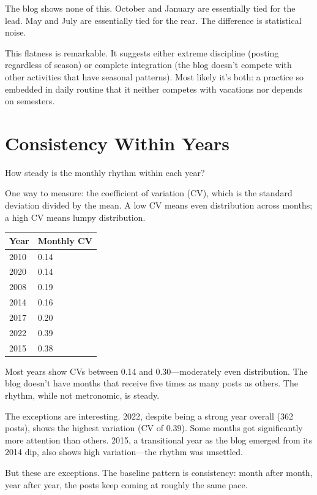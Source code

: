 The blog shows none of this. October and January are essentially tied for the lead. May and July are essentially tied for the rear. The difference is statistical noise.

This flatness is remarkable. It suggests either extreme discipline (posting regardless of season) or complete integration (the blog doesn't compete with other activities that have seasonal patterns). Most likely it's both: a practice so embedded in daily routine that it neither competes with vacations nor depends on semesters.

\bigskip

\section*{Consistency Within Years}

How steady is the monthly rhythm within each year?

One way to measure: the coefficient of variation (CV), which is the standard deviation divided by the mean. A low CV means even distribution across months; a high CV means lumpy distribution.

\begin{center}
\begin{tabular}{ll}
\toprule
\textbf{Year} & \textbf{Monthly CV} \\
\midrule
2010 & 0.14 \\
2020 & 0.14 \\
2008 & 0.19 \\
2014 & 0.16 \\
2017 & 0.20 \\
2022 & 0.39 \\
2015 & 0.38 \\
\bottomrule
\end{tabular}
\end{center}

Most years show CVs between 0.14 and 0.30—moderately even distribution. The blog doesn't have months that receive five times as many posts as others. The rhythm, while not metronomic, is steady.

The exceptions are interesting. 2022, despite being a strong year overall (362 posts), shows the highest variation (CV of 0.39). Some months got significantly more attention than others. 2015, a transitional year as the blog emerged from its 2014 dip, also shows high variation—the rhythm was unsettled.

But these are exceptions. The baseline pattern is consistency: month after month, year after year, the posts keep coming at roughly the same pace.

